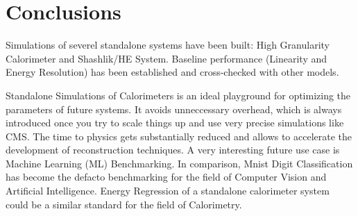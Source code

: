 \section{Conclusions} \label{section:simulations_conclusions}
Simulations of severel standalone systems have been built: High Granularity Calorimeter and Shashlik/HE System. Baseline performance (Linearity and Energy Resolution) has been established and cross-checked with other models. %

Standalone Simulations of Calorimeters is an ideal playground for optimizing the parameters of future systems. It avoids unneccessary overhead, which is always introduced once you try to scale things up and use very precise simulations like CMS. The time to physics gets substantially reduced and allows to accelerate the development of reconstruction techniques. A very interesting future use case is Machine Learning (ML) Benchmarking. In comparison, Mnist Digit Classification has become the defacto benchmarking for the field of Computer Vision and Artificial Intelligence. Energy Regression of a standalone calorimeter system could be a similar standard for the field of Calorimetry.
